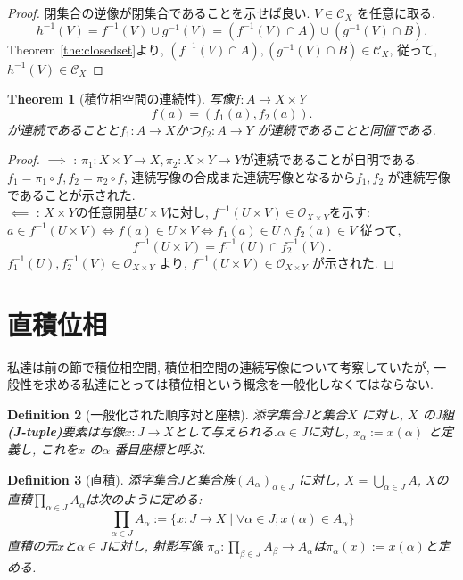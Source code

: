 \documentclass[lualatex]{ltjsbook}
\newtheorem{theorem}{Theorem}[chapter]
\newtheorem{definition}[theorem]{Definition}
\theoremstyle{remark}
\theoremstyle{plain}
\begin{document}
\begin{proof}
	閉集合の逆像が閉集合であることを示せば良い.
	$V\in \mathcal{C}_X$ を任意に取る.
	\[
	h^{-1}(V) =f^{-1}(V) \cup g^{-1}(V) = \left( f^{-1}(V) \cap A \right) \cup \left( g^{-1}(V) \cap B \right) 
	.\] 
	Theorem \ref{the:closedset}より,  $\left( f^{-1}(V) \cap A \right), \left( g^{-1}(V) \cap B \right) \in \mathcal{C}_X $, 従って, $h^{-1}(V) \in \mathcal{C}_X$
\end{proof}

\begin{theorem}[積位相空間の連続性]
	写像$f:A \to X\times Y$\[
	f(a)=\left( f_1(a), f_2(a) \right) 
	.\] 	
	が連続であることと$f_1 : A\to X$かつ$f_2 : A \to Y$ が連続であることと同値である.
\end{theorem}

\begin{proof}
	$\implies$ : $\pi_1 : X\times Y \to X, \pi_2 : X\times Y \to Y$が連続であることが自明である. $f_1=\pi_1 \circ f,  f_2=\pi_2 \circ f $, 連続写像の合成また連続写像となるから$f_1, f_2$ が連続写像であることが示された.\\
	$\impliedby$ : $X\times Y$の任意開基$U\times V$に対し,  $f^{-1}\left( U\times V \right) \in \mathcal{O}_{X\times Y}$を示す: $a \in f^{-1}(U\times V) \iff f(a) \in U\times V \iff f_1(a) \in U \land f_2(a) \in V$
	従って, 
	\[
	f^{-1}(U\times V) = f_1^{-1}(U) \cap f_2^{-1}(V)
	.\] 
	$f_1^{-1}(U), f_2^{-1}(V) \in \mathcal{O}_{X\times Y}$ より, $f^{-1}(U\times V) \in \mathcal{O}_{X\times Y}$ が示された.
\end{proof}

\section{直積位相}%
\label{sec:直積位相}
私達は前の節で積位相空間,  積位相空間の連続写像について考察していたが,  一般性を求める私達にとっては積位相という概念を一般化しなくてはならない.

\begin{definition}[一般化された順序対と座標]
	添字集合$J$と集合$X$ に対し,  $X$ のJ組 \textbf{(J-tuple)}要素は写像$x:J\to X$として与えられる.$\alpha \in J$に対し,  $x_{\alpha}:=x\left( \alpha \right) $ と定義し, これを$x$ の$\alpha$ 番目座標と呼ぶ.
\end{definition}

\begin{definition}[直積]
	添字集合$J$と集合族$\left( A_{\alpha} \right) _{\alpha \in J}$ に対し,   $X=\bigcup_{\alpha \in J} A$,  $X$の直積$\prod_{\alpha \in J}A_{\alpha}$は次のように定める:
	 \[
	\prod_{\alpha \in J}A_{\alpha} :=\{x:J\to X \mid \forall \alpha \in J; x(\alpha) \in A_{\alpha} \} 
	\] 
	直積の元$x$と$\alpha \in J$に対し,  射影写像 $\pi_{\alpha} : \prod_{\beta \in J}A_{\beta} \to A_{\alpha}$は$\pi_{\alpha}(x):= x(\alpha)$と定める.
\end{definition}
\end{document}
